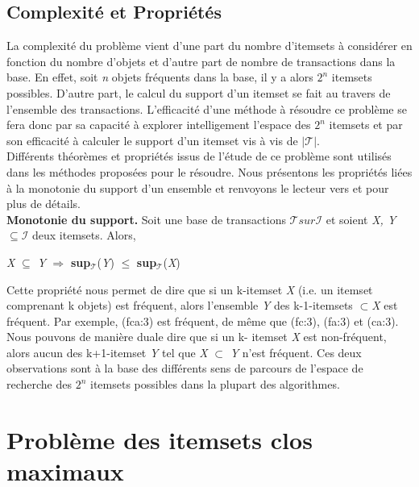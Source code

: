 \documentclass[a4paper,10pt]{report}
\begin{document}
\subsection{Complexité et Propriétés}
La complexité du problème vient d'une part du nombre d'itemsets à considérer en fonction du nombre d'objets et d'autre part de nombre de transactions dans la base. En effet, soit \emph{n} objets fréquents dans la base, il y a alors $2^{n}$ itemsets possibles. D'autre part, le calcul du support d'un itemset se fait au travers de l'ensemble des transactions. L'efficacité d'une méthode à résoudre ce problème se fera donc par sa capacité à explorer intelligement l'espace des $2^{n}$ itemsets et par son efficacité à calculer le support d'un itemset vis à vis de $| \mathcal{T} |$. \\
\hspace{0.15cm}Différents théorèmes et propriétés issus de l'étude de ce problème sont utilisés dans les méthodes proposées pour le résoudre. Nous présentons les propriétés liées à la monotonie du support d'un ensemble et renvoyons le lecteur vers \cite{BOD06} et \cite{GOE} pour plus de détails. \\
\textbf{Monotonie du support.} Soit une base de transactions $ \mathcal{T} sur \mathcal{I} $ et soient \emph{X, Y} $\subseteq \mathcal{I}$ deux itemsets. Alors, \\
\begin{center}
\emph{X} $\subseteq $ \emph{Y} $\Rightarrow$ \textbf{sup$_{\mathcal{T}}$}(\emph{Y}) $ \leq $ \textbf{sup$_{\mathcal{T}}$}(\emph{X})
\end{center}

Cette propriété nous permet de dire que si un k-itemset \emph{X} (i.e. un itemset comprenant k objets) est fréquent, alors l'ensemble \emph{Y} des k-1-itemsets $\subset $\emph{X} est fréquent. Par exemple, (fca:3) est fréquent, de même que (fc:3), (fa:3) et (ca:3). Nous pouvons de manière duale dire que si un k- itemset \emph{X} est non-fréquent, alors aucun des k+1-itemset \emph{Y} tel que \emph{X} $ \subset $ \emph{Y} n'est fréquent. Ces deux observations sont à la base des différents sens de parcours de l'espace de recherche des $2^{n}$ itemsets possibles dans la plupart des algorithmes.

\section{Problème des itemsets clos maximaux}
\end{document}
